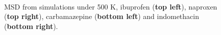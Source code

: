 \begin{figure}[htb]
	\centering
	\\
	\caption{MSD from simulations under 500 K, ibuprofen (\textbf{top left}), naproxen (\textbf{top right}), carbamazepine (\textbf{bottom left}) and indomethacin (\textbf{bottom right}).}
	\label{fig:msd_r2}    
\end{figure}

